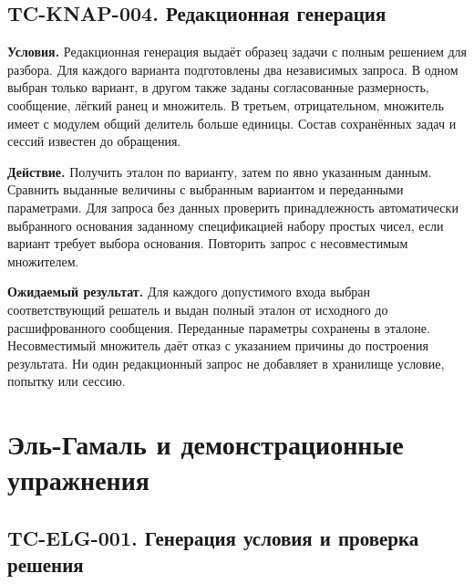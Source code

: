 \documentclass[12pt,a4paper]{article}
\begin{document}
\subsection{TC-KNAP-004. Редакционная генерация}\label{tc-knap-004-ux440ux435ux434ux430ux43aux446ux438ux43eux43dux43dux430ux44f-ux433ux435ux43dux435ux440ux430ux446ux438ux44f}

\hypertarget{tc-knap-004-редакционная-генерация}{}

\hypertarget{tc-knap-004}{}

\textbf{Условия.} Редакционная генерация выдаёт образец задачи с полным решением для разбора. Для каждого варианта подготовлены два независимых запроса. В одном выбран только вариант, в другом также заданы согласованные размерность, сообщение, лёгкий ранец и множитель. В третьем, отрицательном, множитель имеет с модулем общий делитель больше единицы. Состав сохранённых задач и сессий известен до обращения.

\textbf{Действие.} Получить эталон по варианту, затем по явно указанным данным. Сравнить выданные величины с выбранным вариантом и переданными параметрами. Для запроса без данных проверить принадлежность автоматически выбранного основания заданному спецификацией набору простых чисел, если вариант требует выбора основания. Повторить запрос с несовместимым множителем.

\textbf{Ожидаемый результат.} Для каждого допустимого входа выбран соответствующий решатель и выдан полный эталон от исходного до расшифрованного сообщения. Переданные параметры сохранены в эталоне. Несовместимый множитель даёт отказ с указанием причины до построения результата. Ни один редакционный запрос не добавляет в хранилище условие, попытку или сессию.

\section{Эль-Гамаль и демонстрационные упражнения}\label{ux44dux43bux44c-ux433ux430ux43cux430ux43bux44c-ux438-ux434ux435ux43cux43eux43dux441ux442ux440ux430ux446ux438ux43eux43dux43dux44bux435-ux443ux43fux440ux430ux436ux43dux435ux43dux438ux44f}

\hypertarget{эль-гамаль-и-демонстрационные-упражнения}{}

\subsection{TC-ELG-001. Генерация условия и проверка решения}\label{tc-elg-001-ux433ux435ux43dux435ux440ux430ux446ux438ux44f-ux443ux441ux43bux43eux432ux438ux44f-ux438-ux43fux440ux43eux432ux435ux440ux43aux430-ux440ux435ux448ux435ux43dux438ux44f}
\end{document}
